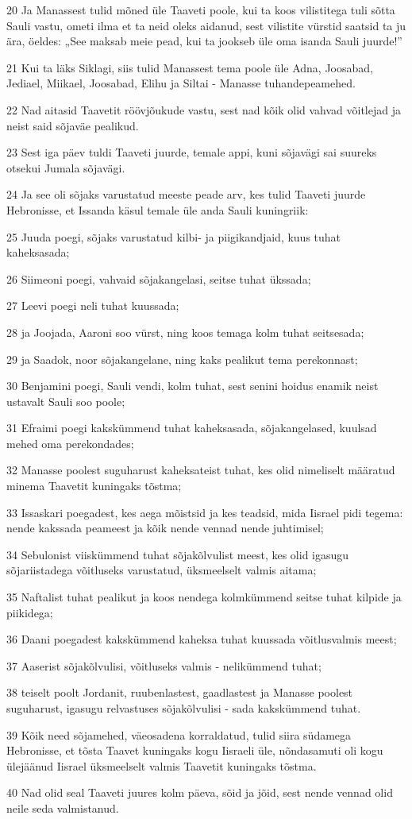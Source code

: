 \par 20 Ja Manassest tulid mõned üle Taaveti poole, kui ta koos vilistitega tuli sõtta Sauli vastu, ometi ilma et ta neid oleks aidanud, sest vilistite vürstid saatsid ta ju ära, öeldes: „See maksab meie pead, kui ta jookseb üle oma isanda Sauli juurde!”
\par 21 Kui ta läks Siklagi, siis tulid Manassest tema poole üle Adna, Joosabad, Jediael, Miikael, Joosabad, Elihu ja Siltai - Manasse tuhandepeamehed.
\par 22 Nad aitasid Taavetit röövjõukude vastu, sest nad kõik olid vahvad võitlejad ja neist said sõjaväe pealikud.
\par 23 Sest iga päev tuldi Taaveti juurde, temale appi, kuni sõjavägi sai suureks otsekui Jumala sõjavägi.
\par 24 Ja see oli sõjaks varustatud meeste peade arv, kes tulid Taaveti juurde Hebronisse, et Issanda käsul temale üle anda Sauli kuningriik:
\par 25 Juuda poegi, sõjaks varustatud kilbi- ja piigikandjaid, kuus tuhat kaheksasada;
\par 26 Siimeoni poegi, vahvaid sõjakangelasi, seitse tuhat ükssada;
\par 27 Leevi poegi neli tuhat kuussada;
\par 28 ja Joojada, Aaroni soo vürst, ning koos temaga kolm tuhat seitsesada;
\par 29 ja Saadok, noor sõjakangelane, ning kaks pealikut tema perekonnast;
\par 30 Benjamini poegi, Sauli vendi, kolm tuhat, sest senini hoidus enamik neist ustavalt Sauli soo poole;
\par 31 Efraimi poegi kakskümmend tuhat kaheksasada, sõjakangelased, kuulsad mehed oma perekondades;
\par 32 Manasse poolest suguharust kaheksateist tuhat, kes olid nimeliselt määratud minema Taavetit kuningaks tõstma;
\par 33 Issaskari poegadest, kes aega mõistsid ja kes teadsid, mida Iisrael pidi tegema: nende kakssada peameest ja kõik nende vennad nende juhtimisel;
\par 34 Sebulonist viiskümmend tuhat sõjakõlvulist meest, kes olid igasugu sõjariistadega võitluseks varustatud, üksmeelselt valmis aitama;
\par 35 Naftalist tuhat pealikut ja koos nendega kolmkümmend seitse tuhat kilpide ja piikidega;
\par 36 Daani poegadest kakskümmend kaheksa tuhat kuussada võitlusvalmis meest;
\par 37 Aaserist sõjakõlvulisi, võitluseks valmis - nelikümmend tuhat;
\par 38 teiselt poolt Jordanit, ruubenlastest, gaadlastest ja Manasse poolest suguharust, igasugu relvastuses sõjakõlvulisi - sada kakskümmend tuhat.
\par 39 Kõik need sõjamehed, väeosadena korraldatud, tulid siira südamega Hebronisse, et tõsta Taavet kuningaks kogu Iisraeli üle, nõndasamuti oli kogu ülejäänud Iisrael üksmeelselt valmis Taavetit kuningaks tõstma.
\par 40 Nad olid seal Taaveti juures kolm päeva, sõid ja jõid, sest nende vennad olid neile seda valmistanud.

